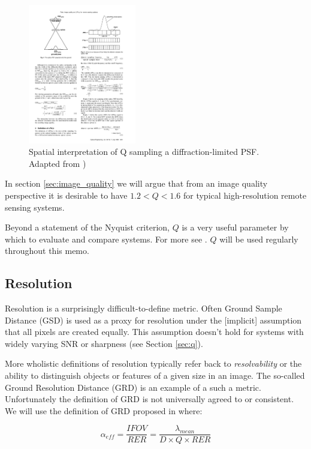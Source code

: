 \documentclass[10pt,journal]{IEEEtran}  %
\begin{document}
\begin{figure}[h!]
\includegraphics[width=0.42\textwidth]{figures/Q_fiete.pdf}
\caption{Spatial interpretation of Q sampling a diffraction-limited PSF.  Adapted from \cite{fiete_q})}
\end{figure}

In section \ref{sec:image_quality} we will argue that from an image quality perspective it is desirable to have $1.2 < Q < 1.6$ for typical high-resolution remote sensing systems.  

Beyond a statement of the Nyquist criterion, $Q$ is a very useful parameter by which to evaluate and compare systems.  For more see \cite{fiete_q}.  $Q$ will be used regularly throughout this memo.

\subsection{Resolution}
Resolution is a surprisingly difficult-to-define metric.  Often Ground Sample Distance (GSD) is used as a proxy for resolution under the [implicit] assumption that all pixels are created equally.  This assumption doesn't hold for systems with widely varying SNR or sharpness (see Section \ref{sec:q}).

More wholistic definitions of resolution typically refer back to \emph{resolvability} or the ability to distinguish objects or features of a given size in an image.  The so-called Ground Resolution Distance (GRD) is an example of a such a metric.  Unfortunately the definition of GRD is not universally agreed to or consistent.  We will use the definition of GRD proposed in \cite{auelmann_iq} where:

\begin{equation}
    \alpha_{eff} = \frac{IFOV}{RER} = \frac{\lambda_{mean}}{D\times Q \times RER}
\label{eq:alpha_eff}
\end{equation}
\end{document}
